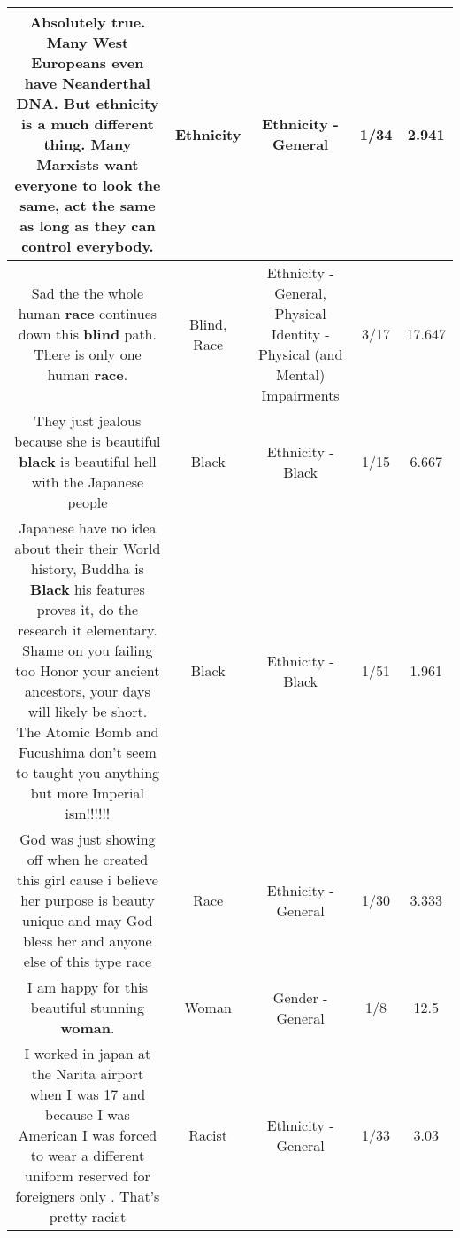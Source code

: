 \documentclass[11pt]{article}
\newlength\mylength
\begin{document}
\begin{center}
\begin{longtable}{|C{.65\mylength}|C{.30\mylength}|C{.12\mylength}|C{.12\mylength}|C{.12\mylength}|}
  \small Absolutely true. Many West Europeans even have Neanderthal DNA. But \textbf{ethnicity} is a much different thing. Many Marxists want everyone to look the same, act the same as long as they can control everybody.\normalsize   & Ethnicity & Ethnicity - General & 1/34 & 2.941 \\  \hline
  \small Sad the the whole human \textbf{race} continues down this \textbf{blind} path.  There is only one human \textbf{race}.\normalsize   & Blind, Race & Ethnicity - General, Physical Identity - Physical (and Mental) Impairments & 3/17 & 17.647 \\  \hline
  \small They just jealous because she is beautiful \textbf{black} is beautiful hell with the Japanese people\normalsize   & Black & Ethnicity - Black & 1/15 & 6.667 \\  \hline
  \small Japanese have no idea about their their World history, Buddha is \textbf{Black} his features proves it, do the research it elementary. Shame on you failing too Honor your ancient ancestors, your days will likely be short. The Atomic Bomb and Fucushima don't seem to taught you anything but more Imperial ism!!!!!!\normalsize   & Black & Ethnicity - Black & 1/51 & 1.961 \\  \hline
  \small God was just showing off when he created this girl cause i believe her purpose is beauty unique and may God bless her and anyone else of this type race\normalsize   & Race & Ethnicity - General & 1/30 & 3.333 \\  \hline
  \small I am happy for this beautiful stunning \textbf{woman}.\normalsize   & Woman & Gender - General & 1/8 & 12.5 \\  \hline
  \small I worked in japan at the Narita airport when I was 17 and because I was American I was forced to wear a different uniform reserved for foreigners only .  That's pretty racist\normalsize   & Racist & Ethnicity - General & 1/33 & 3.03 \\  \hline

\end{longtable}
\end{center}
\end{document}
